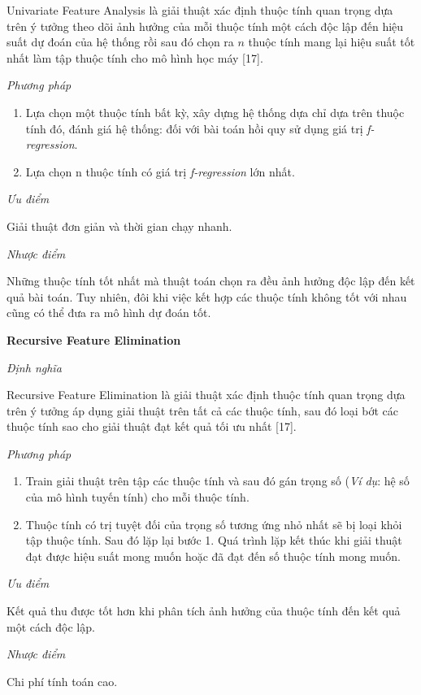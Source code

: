 \documentclass[12pt]{extarticle}
\begin{document}
				\par Univariate Feature Analysis là giải thuật xác định thuộc tính quan trọng dựa trên ý tưởng theo dõi ảnh hưởng của mỗi thuộc tính một cách độc lập đến hiệu suất dự đoán của hệ thống rồi sau đó chọn ra $n$ thuộc tính mang lại hiệu suất tốt nhất làm tập thuộc tính cho mô hình học máy [17].
				\par \textit{Phương pháp}
				\begin{enumerate}
					\item Lựa chọn một thuộc tính bất kỳ, xây dựng hệ thống dựa chỉ dựa trên thuộc tính đó, đánh giá hệ thống: đối với bài toán hồi quy sử dụng giá trị \textit{f-regression}.
					\item Lựa chọn n thuộc tính có giá trị \textit{f-regression} lớn nhất.
				\end{enumerate}
				\par  \textit{Ưu điểm}
				\par Giải thuật đơn giản và thời gian chạy nhanh.
				\par  \textit{Nhược điểm}
				\par Những thuộc tính tốt nhất mà thuật toán chọn ra đều ảnh hưởng độc lập đến kết quả bài toán. Tuy nhiên, đôi khi việc kết hợp các thuộc tính không tốt với nhau cũng có thể đưa ra mô hình dự đoán tốt.
			\par \textbf{Recursive Feature Elimination}
				\par \textit{Định nghĩa} 
				\par Recursive Feature Elimination là giải thuật xác định thuộc tính quan trọng dựa trên ý tưởng áp dụng giải thuật trên tất cả các thuộc tính, sau đó loại bớt các thuộc tính sao cho giải thuật đạt kết quả tối ưu nhất [17].
				\par \textit{Phương pháp}
				\begin{enumerate}
					\item Train giải thuật trên tập các thuộc tính và sau đó gán trọng số (\textit{Ví dụ}: hệ số của mô hình tuyến tính) cho mỗi thuộc tính.
					\item Thuộc tính có trị tuyệt đối của trọng số tương ứng nhỏ nhất sẽ bị loại khỏi tập thuộc tính. Sau đó lặp lại bước 1. Quá trình lặp kết thúc khi giải thuật đạt được hiệu suất mong muốn hoặc đã đạt đến số thuộc tính mong muốn.

				\end{enumerate}
				\par  \textit{Ưu điểm}
				\par Kết quả thu được tốt hơn khi phân tích ảnh hưởng của thuộc tính đến kết quả một cách độc lập.
				\par  \textit{Nhược điểm}
				\par Chi phí tính toán cao.		
\end{document}

